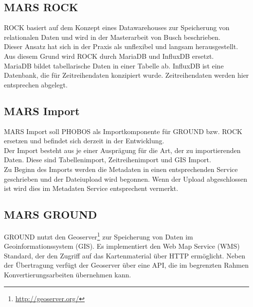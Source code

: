 \documentclass[10pt,conference,compsocconf]{IEEEtran}
\begin{document}
\subsection{MARS ROCK}
ROCK basiert auf dem Konzept eines Datawarehouses zur Speicherung von relationalen Daten und wird in der Masterarbeit von Busch\cite{JanBusch} beschrieben. \\
Dieser Ansatz hat sich in der Praxis als unflexibel und langsam herausgestellt. Aus diesem Grund wird ROCK durch MariaDB und InfluxDB ersetzt. \\
MariaDB bildet tabellarische Daten in einer Tabelle ab. InfluxDB ist eine Datenbank, die für Zeitreihendaten konzipiert wurde. Zeitreihendaten werden hier entsprechen abgelegt.\\


\subsection{MARS Import}
MARS Import soll PHOBOS als Importkomponente für GROUND bzw. ROCK ersetzen und befindet sich derzeit in der Entwicklung. \\
Der Import besteht aus je einer Ausprägung für die Art, der zu importierenden Daten. Diese sind Tabellenimport, Zeitreihenimport und GIS Import. \\
Zu Beginn des Imports werden die Metadaten in einen entsprechenden Service geschrieben und der Dateiupload wird begonnen. Wenn der Upload abgeschlossen ist wird dies im Metadaten Service entsprechent vermerkt.\\


\subsection{MARS GROUND}
GROUND nutzt den Geoserver\footnote{\url{http://geoserver.org/}} zur Speicherung von Daten im Geoinformationssystem (GIS). Es implementiert den Web Map Service (WMS) Standard, der den Zugriff auf das Kartenmaterial über HTTP ermöglicht. Neben der Übertragung verfügt der Geoserver über eine API, die im begrenzten Rahmen Konvertierungsarbeiten übernehmen kann.\\
\end{document}
